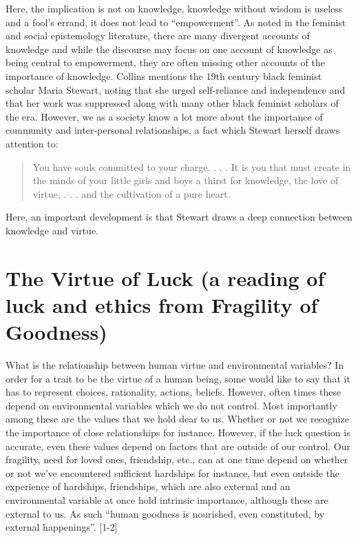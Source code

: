 \documentclass[
  letterpaper,
  DIV=11,
  numbers=noendperiod]{scrreprt}
\begin{document}
\begin{tcolorbox}[enhanced jigsaw, arc=.35mm, breakable, rightrule=.15mm, colback=white, colframe=quarto-callout-important-color-frame, bottomrule=.15mm, leftrule=.75mm, opacityback=0, toprule=.15mm, left=2mm]
\begin{tcolorbox}[enhanced jigsaw, arc=.35mm, breakable, rightrule=.15mm, colback=white, colframe=quarto-callout-tip-color-frame, bottomrule=.15mm, leftrule=.75mm, opacityback=0, toprule=.15mm, left=2mm]
Here, the implication is not on knowledge, knowledge without wisdom is
useless and a fool's errand, it does not lead to ``empowerment''. As
noted in the feminist and social epistemology literature, there are many
divergent accounts of knowledge and while the discourse may focus on one
account of knowledge as being central to empowerment, they are often
missing other accounts of the importance of knowledge. Collins mentions
the 19th century black feminist scholar Maria Stewart, noting that she
urged self-reliance and independence and that her work was suppressed
along with many other black feminist scholars of the era. However, we as
a society know a lot more about the importance of community and
inter-personal relationships, a fact which Stewart herself draws
attention to:

\begin{quote}
You have souls committed to your charge. . . . It is you that must
create in the minds of your little girls and boys a thirst for
knowledge, the love of virtue, . . . and the cultivation of a pure
heart.
\end{quote}

Here, an important development is that Stewart draws a deep connection
between knowledge and virtue.

\chapter{The Virtue of Luck (a reading of luck and ethics from Fragility
of
Goodness)}\label{the-virtue-of-luck-a-reading-of-luck-and-ethics-from-fragility-of-goodness}

What is the relationship between human virtue and environmental
variables? In order for a trait to be the virtue of a human being, some
would like to say that it has to represent choices, rationality,
actions, beliefs. However, often times these depend on environmental
variables which we do not control. Most importantly among these are the
values that we hold dear to us. Whether or not we recognize the
importance of close relationships for instance. However, if the luck
question is accurate, even these values depend on factors that are
outside of our control. Our fragility, need for loved ones, friendship,
etc., can at one time depend on whether or not we've encountered
sufficient hardships for instance, but even outside the experience of
hardships, friendships, which are also external and an environmental
variable at once hold intrinsic importance, although these are external
to us. As such ``human goodness is nourished, even constituted, by
external happenings''. {[}1-2{]}


\end{tcolorbox}
\end{tcolorbox}
\end{document}

